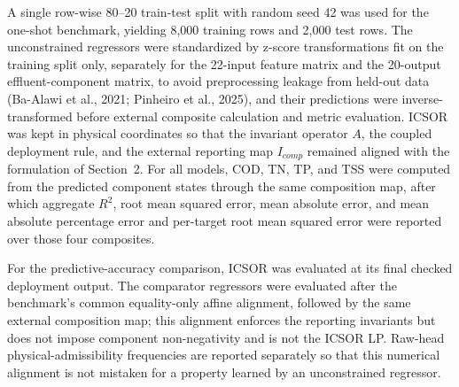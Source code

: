 \documentclass[a4paper,fleqn]{cas-sc}
\newenvironment{revblock}{}{}
\newenvironment{revblockr25}{}{}
\begin{document}
\begin{revblock}
\begin{revblockr25}
A single row-wise 80--20 train-test split with random seed 42 was used for the one-shot benchmark, yielding 8,000 training rows and 2,000 test rows. The unconstrained regressors were standardized by z-score transformations fit on the training split only, separately for the 22-input feature matrix and the 20-output effluent-component matrix, to avoid preprocessing leakage from held-out data (Ba-Alawi et al., 2021; Pinheiro et al., 2025), and their predictions were inverse-transformed before external composite calculation and metric evaluation. ICSOR was kept in physical coordinates so that the invariant operator $A$, the coupled deployment rule, and the external reporting map $I_{comp}$ remained aligned with the formulation of Section~2. For all models, COD, TN, TP, and TSS were computed from the predicted component states through the same composition map, after which aggregate $R^2$, root mean squared error, mean absolute error, and mean absolute percentage error and per-target root mean squared error were reported over those four composites.

For the predictive-accuracy comparison, ICSOR was evaluated at its final checked deployment output. The comparator regressors were evaluated after the benchmark's common equality-only affine alignment, followed by the same external composition map; this alignment enforces the reporting invariants but does not impose component non-negativity and is not the ICSOR LP. Raw-head physical-admissibility frequencies are reported separately so that this numerical alignment is not mistaken for a property learned by an unconstrained regressor.


\end{revblockr25}
\end{revblock}
\end{document}
